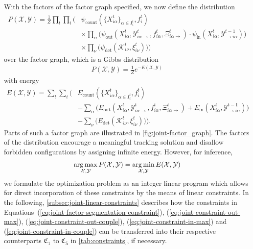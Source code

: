 With the factors of the factor graph specified, we now define the distribution
\begin{align}
    \label{eq:joint-distribution-fg}
    P(\mathcal{X},\mathcal{Y}) = \frac{1}{Z}\prod_t\prod_i
    \Bigg(&\psi_{\text{count}}(\{X_{i\alpha}^t\}_{\alpha \in I_i^t},f_{i}^t) \\ \nonumber
    &\times\prod_{\alpha}\Big(\psi_{\mathrm{out}}(X_{i\alpha}^t, \mathcal{Y}_{i\alpha\rightarrow}^{t},
    f_{i\alpha}^t, \Xi_{i\alpha\rightarrow}^{t}) \cdot \psi_{\mathrm{in}}(X_{i\alpha}^{t},
    \mathcal{Y}_{\rightarrow i\alpha}^{t-1})\Big) \\ \nonumber
    &\times\prod_{\nu}\Big(\psi_{\text{det}}(\mathcal{K}_{i\nu}^t, \xi_{i\nu}^t)\Big)\Bigg)
\end{align}
over the factor graph, which is a Gibbs distribution
\begin{align}
    P(\mathcal{X},\mathcal{Y}) = \frac{1}{Z}e^{-E(\mathcal{X},\mathcal{Y})}
\end{align}
with energy
\begin{align}
    \label{eq:joint-energy-fg}
    E(\mathcal{X},\mathcal{Y})=\sum_t\sum_i
    \Bigg(&E_{\text{count}}(\{X_{i\alpha}^t\}_{\alpha \in I_i^t},f_{i}^t) \\ \nonumber
    &+\sum_{\alpha}\Big(E_{\mathrm{out}}(X_{i\alpha}^t, \mathcal{Y}_{i\alpha\rightarrow}^{t},
    f_{i\alpha}^t, \Xi_{i\alpha\rightarrow}^{t}) + E_{\mathrm{in}}(X_{i\alpha}^{t},
    \mathcal{Y}_{\rightarrow i\alpha}^{t-1})\Big) \\ \nonumber
    &+\sum_{\nu}\Big(E_{\text{det}}(\mathcal{K}_{i\nu}^t, \xi_{i\nu}^t)\Big)\Bigg).
\end{align}
Parts of such a factor graph are illustrated in \cref{fig:joint-factor_graph}. The factors of
the distribution encourage a meaningful tracking solution and disallow forbidden configurations by
assigning infinite energy. However, for inference,
\begin{align}
    \operatorname*{arg\,max}_{\mathcal{X},\mathcal{Y}}P(\mathcal{X},\mathcal{Y}) = \operatorname*{arg\,min}_{\mathcal{X},\mathcal{Y}}E(\mathcal{X},\mathcal{Y})
\end{align}
we formulate the optimization problem as an integer linear program which allows for direct
incorporation of these constraints by the means of linear constraints. In the following,
\cref{subsec:joint-linear-constraints} describes how the constraints in
Equations~(\ref{eq:joint-factor-segmentation-constraint}), (\ref{eq:joint-constraint-out-max}),
(\ref{eq:joint-constraint-out-couple}), (\ref{eq:joint-constraint-in-max}) and
(\ref{eq:joint-constraint-in-couple}) can be transferred into their respective counterparts
$\mathfrak{C}_1$ to $\mathfrak{C}_5$ in \cref{tab:constraints}, if necessary.


